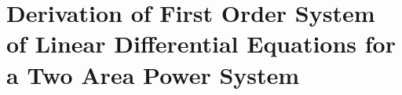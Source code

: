 \chapter{Derivation of First Order System of Linear Differential Equations for a Two Area Power System}